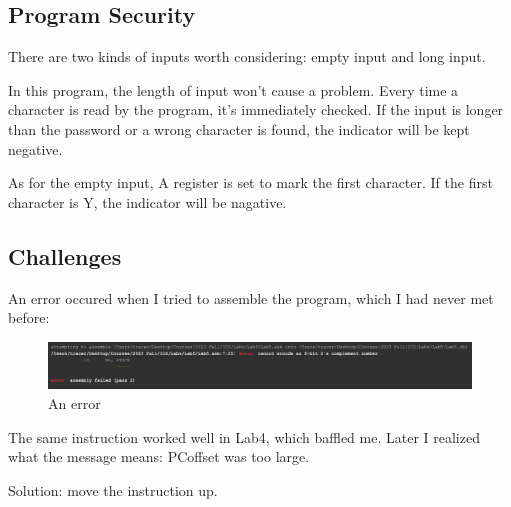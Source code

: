 \documentclass[UTF8]{ctexart}
\begin{document}
\subsection{Program Security}
There are two kinds of inputs worth considering: empty input and long input.

In this program, the length of input won't cause a problem. 
Every time a character is read by the program, it's immediately
checked. If the input is longer than the password or a wrong character is found, 
the indicator will be kept negative. 

As for the empty input, A register is set to mark the first character. 
If the first character is Y, the indicator will be nagative.

\subsection{Challenges}

An error occured when I tried to assemble the program, which I had
never met before:
\begin{figure}[H]
    \centering
    \includegraphics[scale=0.3]{Error1.png}
    \caption{An error}
\end{figure}

The same instruction worked well in Lab4, which baffled me. Later I realized what 
the message means: PCoffset was too large. 

Solution: move the instruction up.
\end{document}
